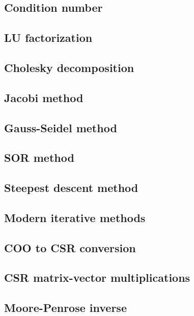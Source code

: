 \documentclass[article,A4,12pt]{llncs}
\begin{document}
\subsection{Condition number}


\subsection{LU factorization}


\subsection{Cholesky decomposition}


\subsection{Jacobi method}


\subsection{Gauss-Seidel method}


\subsection{SOR method}


\subsection{Steepest descent method}


\subsection{Modern iterative methods}


\subsection{COO to CSR conversion}


\subsection{CSR matrix-vector multiplications}


\subsection{Moore-Penrose inverse}
\end{document}
